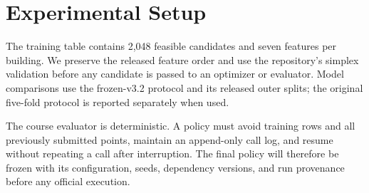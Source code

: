 \section{Experimental Setup}
The training table contains 2,048 feasible candidates and seven features per building. We preserve the released feature order and use the repository's simplex validation before any candidate is passed to an optimizer or evaluator. Model comparisons use the frozen-v3.2 protocol and its released outer splits; the original five-fold protocol is reported separately when used.

The course evaluator is deterministic. A policy must avoid training rows and all previously submitted points, maintain an append-only call log, and resume without repeating a call after interruption. The final policy will therefore be frozen with its configuration, seeds, dependency versions, and run provenance before any official execution.
